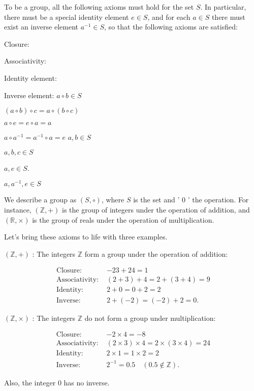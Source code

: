 To be a group, all the following axioms must hold for the set $S$. In particular, there must be a special identity element $e \in S$, and for each $a \in S$ there must exist an inverse element $a^{-1} \in S$, so that the following axioms are satisfied:

Closure:

Associativity:

Identity element:

Inverse element: $a \circ b \in S$

$(a \circ b) \circ c=a \circ(b \circ c)$

$a \circ e=e \circ a=a$

$a \circ a^{-1}=a^{-1} \circ a=e$ $a, b \in S$

$a, b, c \in S$

$a, e \in S$.

$a, a^{-1}, e \in S$

We describe a group as $(S, \circ)$, where $S$ is the set and ' 0 ' the operation. For instance, $(\mathbb{Z},+)$ is the group of integers under the operation of addition, and $(\mathbb{R}, \times)$ is the group of reals under the operation of multiplication.

Let's bring these axioms to life with three examples.

$(\mathbb{Z},+)$ : The integers $\mathbb{Z}$ form a group under the operation of addition:

$$
\begin{aligned}
\text { Closure: } & -23+24=1 \\
\text { Associativity: } & (2+3)+4=2+(3+4)=9 \\
\text { Identity: } & 2+0=0+2=2 \\
\text { Inverse: } & 2+(-2)=(-2)+2=0 .
\end{aligned}
$$

$(\mathbb{Z}, \times)$ : The integers $\mathbb{Z}$ do not form a group under multiplication:

$$
\begin{aligned}
\text { Closure: } & -2 \times 4=-8 \\
\text { Associativity: } & (2 \times 3) \times 4=2 \times(3 \times 4)=24 \\
\text { Identity: } & 2 \times 1=1 \times 2=2 \\
\text { Inverse: } & 2^{-1}=0.5 \quad(0.5 \notin \mathbb{Z}) .
\end{aligned}
$$

Also, the integer 0 has no inverse.

